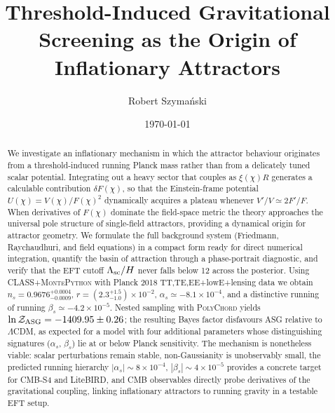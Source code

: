 \documentclass[11pt,a4paper]{article}
\title{Threshold-Induced Gravitational Screening as the Origin of Inflationary Attractors}
\author{Robert Szyma\'{n}ski}
\date{\today}
\begin{document}
\maketitle

\begin{abstract}
We investigate an inflationary mechanism in which the attractor behaviour originates from a threshold-induced running Planck mass rather than from a delicately tuned scalar potential. Integrating out a heavy sector that couples as $\xi(\chi) R$ generates a calculable contribution $\delta F(\chi)$, so that the Einstein-frame potential $U(\chi)=V(\chi)/F(\chi)^2$ dynamically acquires a plateau whenever $V'/V\simeq2F'/F$. When derivatives of $F(\chi)$ dominate the field-space metric the theory approaches the universal pole structure of single-field attractors, providing a dynamical origin for attractor geometry. We formulate the full background system (Friedmann, Raychaudhuri, and field equations) in a compact form ready for direct numerical integration, quantify the basin of attraction through a phase-portrait diagnostic, and verify that the EFT cutoff $\Lambda_{\rm sc}/H$ never falls below 12 across the posterior. Using \textsc{CLASS}+\textsc{MontePython} with Planck 2018 TT,TE,EE+lowE+lensing data we obtain $n_s=0.9676^{+0.0004}_{-0.0009}$, $r=(2.3^{+1.5}_{-1.0})\times10^{-2}$, $\alpha_s\simeq-8.1\times10^{-4}$, and a distinctive running of running $\beta_s\simeq-4.2\times10^{-5}$. Nested sampling with \textsc{PolyChord} yields $\ln\mathcal{Z}_{\rm ASG}=-1409.95\pm0.26$; the resulting Bayes factor disfavours ASG relative to $\Lambda$CDM, as expected for a model with four additional parameters whose distinguishing signatures ($\alpha_s$, $\beta_s$) lie at or below Planck sensitivity. The mechanism is nonetheless viable: scalar perturbations remain stable, non-Gaussianity is unobservably small, the predicted running hierarchy $|\alpha_s|\sim8\times10^{-4}$, $|\beta_s|\sim4\times10^{-5}$ provides a concrete target for CMB-S4 and LiteBIRD, and CMB observables directly probe derivatives of the gravitational coupling, linking inflationary attractors to running gravity in a testable EFT setup.
\end{abstract}
\end{document}
